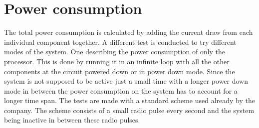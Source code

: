 \section{Power consumption}
 The total power consumption is calculated by adding the current draw from each individual component together.  A different test is conducted to try different modes of the system. One describing the power consumption of only the processor. This is done by running it in an infinite loop with all the other components at the circuit powered down or in power down mode. Since the system is not supposed to be active just a small time with a longer power down mode in between the power consumption on the system has to account for a longer time span. The tests are made with a standard scheme used already by the company. The scheme consists of a small radio pulse every second and the system being inactive in between these radio pulses. 

